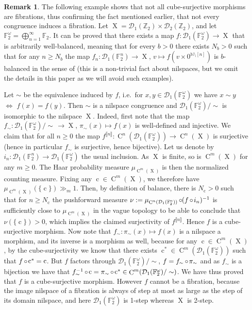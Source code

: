 \documentclass[a4paper,12pt,reqno]{amsart}
\theoremstyle{definition}
\newtheorem{remark}[theorem]{Remark}
\def\to{\rightarrow}
\newcommand*{\db}[1]{\llbracket #1\rrbracket}
\newcommand{\mc}{\mathcal}
\newcommand{\mb}{\mathbb}
\DeclareMathOperator{\q}{c}
\DeclareMathOperator{\ns}{X}
\DeclareMathOperator{\co}{\circ\hspace{-0.02 cm}}
\DeclareMathOperator{\cu}{C}
\begin{document}
\begin{remark}\label{rem:congfibr}
The following example shows that not all cube-surjective morphisms are fibrations, thus confirming the fact mentioned earlier, that not every congruence induces a fibration.
Let $\ns=\mc{D}_1(\mb{Z}_2)\times \mc{D}_2(\mb{Z}_2)$, and let $\mb{F}_2^\omega=\bigoplus_{n=1}^\infty \mb{F}_2$. It can be proved that there exists a map $f:\mc{D}_1(\mb{F}_2^\omega)\to \ns$ that is arbitrarily well-balanced, meaning that for every $b>0$ there exists $N_b>0$ such that for any $n\ge N_b$ the map $f_n:\mc{D}_1(\mb{F}_2^n)\to \ns$, $v\mapsto f(v\times 0^{\mb{N}\setminus [n]})$ is $b$-balanced in the sense of  \cite[Definition 5.1]{CSinverse} (this is a non-trivial fact about nilspaces, but we omit the details in this paper as we will avoid such examples).

Let $\sim$ be the equivalence induced by $f$, i.e.\ for $x,y\in \mc{D}_1(\mb{F}_2^\omega)$ we have $x\sim y$ $\Leftrightarrow$ $f(x)=f(y)$. Then $\sim$ is a nilspace congruence and $\mc{D}_1(\mb{F}_2^\omega)/\!\!\sim$ is isomorphic to the nilspace $\ns$. Indeed, first note that the map $f_\sim:\mc{D}_1(\mb{F}_2^\omega)/\!\!\sim\, \to \ns$, $\pi_\sim(x) \mapsto f(x)$ is well-defined and injective. We claim that for all $n\ge 0$ the map $f^{\db{n}}:\cu^n(\mc{D}_1(\mb{F}_2^\omega))\to \cu^n(\ns)$ is surjective (hence in particular $f_\sim$ is surjective, hence bijective). Let us denote by $i_n:\mc{D}_1(\mb{F}_2^n)\to \mc{D}_1(\mb{F}_2^\omega)$ the usual inclusion. As $\ns$ is finite, so is $\cu^m(\ns)$ for any $m\ge 0$. The Haar probability measure $\mu_{\cu^m(\ns)}$ is then the normalized counting measure. Fixing any $\q\in\cu^m(\ns)$, we therefore have $\mu_{\cu^m(\ns)}(\{\q\})\gg_{m} 1$. Then, by definition of balance, there is $N_{\q}>0$ such that for $n\geq N_{\q}$ the pushforward measure $\nu:=\mu_{\cu^n(\mc{D}_1(\mb{F}_2^n))}\co (f\co i_n)^{-1}$ is sufficiently close to $\mu_{\cu^m(\ns)}$ in the vague topology to be able to conclude that $\nu(\{\q\})>0$, which implies the claimed surjectivity of $f^{\db{n}}$. Hence $f$ is  a cube-surjective morphism. Now note that $f_\sim:\pi_\sim(x)\mapsto f(x)$ is a nilspace a morphism, and its inverse is a morphism as well, because for any $\q\in \cu^m(\ns)$, by the cube-surjectivity we know that there exists $\q^*\in \cu^m(\mc{D}_1(\mb{F}_2^\omega))$ such that $f\co \q^*=\q$. But $f$ factors through $\mc{D}_1(\mb{F}_2^\omega)/\sim$, $f=f_\sim \co \pi_\sim$ and as $f_\sim$ is a bijection we have that $f_\sim^{-1}\co \q = \pi_\sim \co \q^*\in \cu^m(\mc{D}_1(\mb{F}_2^\omega)/\sim)$. We have thus proved that $f$ is a cube-surjective morphism. However $f$ cannot be a fibration, because the image nilspace of a fibration is always of step at most as large as the step of its domain nilspace, and here  $\mc{D}_1(\mb{F}_2^\omega)$ is 1-step whereas $\ns$ is 2-step.
\end{remark}
\end{document}
